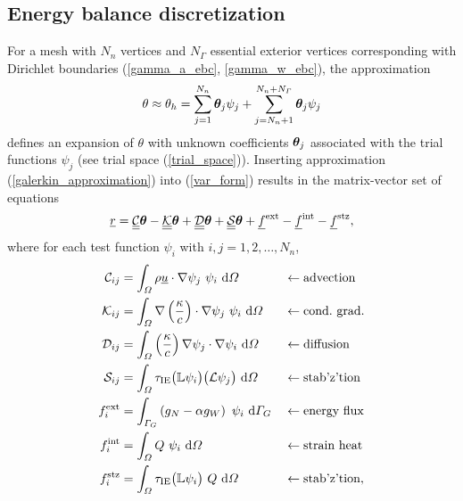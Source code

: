 
\subsection{Energy balance discretization}

For a mesh with $N_n$ vertices and $N_{\Gamma}$ essential exterior vertices corresponding with Dirichlet boundaries (\ref{gamma_a_ebc}, \ref{gamma_w_ebc}), the approximation 
\begin{align}
  \label{galerkin_approximation}
  \theta \approx \theta_h = \sum_{j=1}^{N_n} \bm{\theta}_j \psi_j + \sum_{j=N_n+1}^{N_n+N_{\varGamma}} \bm{\theta}_j \psi_j
\end{align}
defines an expansion of $\theta$ with unknown coefficients $\bm{\theta}_j$ associated with the trial functions $\psi_j$ (see trial space (\ref{trial_space})). Inserting approximation (\ref{galerkin_approximation}) into (\ref{var_form}) results in the matrix-vector set of equations
\begin{align}
  \label{component_var_form}
  \underline{r} = \underline{\underline{\mathcal{C}}}\bm{\theta} - \underline{\underline{\mathcal{K}}}\bm{\theta} + \underline{\underline{\mathcal{D}}}\bm{\theta} + \underline{\underline{\mathcal{S}}} \bm{\theta} + \underline{f}^{\text{ext}} - \underline{f}^{\text{int}} - \underline{f}^{\text{stz}},
\end{align}
where for each test function $\psi_i$ with $i,j = 1, 2, \ldots, N_n$,
\begin{align}
  \label{advective_form}
  \mathcal{C}_{ij} &= \int_{\varOmega} \rho \underline{u} \cdot \nabla \psi_j\ \psi_i \ \mathrm{d}\varOmega &&\leftarrow \text{advection} \\
  \label{conductive_gradient_form}
  \mathcal{K}_{ij} &= \int_{\varOmega} \nabla \left( \frac{\kappa}{c} \right) \cdot \nabla \psi_j\ \psi_i \ \mathrm{d}\varOmega &&\leftarrow \text{cond.~grad.} \\
  \label{diffusion_form}
  \mathcal{D}_{ij} &= \int_{\varOmega} \left( \frac{\kappa}{c} \right) \nabla \psi_j \cdot \nabla \psi_i \ \mathrm{d}\varOmega &&\leftarrow \text{diffusion} \\
  \label{stabilization_form_a}
  \mathcal{S}_{ij} &= \int_{\varOmega} \tau_{\text{IE}} \big( \mathbb{L} \psi_i \big) \big( \mathcal{L} \psi_j \big) \ \mathrm{d}\varOmega &&\leftarrow \text{stab'z'tion} \\
  \label{basal_energy_gradient_form}
  f_i^{\text{ext}} &= \int_{\varGamma_G} \left( g_N - \alpha g_W \right)\ \psi_i \ \mathrm{d}\varGamma_G &&\leftarrow \text{energy flux} \\
  \label{internal_friction_form}
  f_i^{\text{int}} &= \int_{\varOmega} Q\ \psi_i \ \mathrm{d}\varOmega &&\leftarrow \text{strain heat} \\
  \label{stabilization_form_l}
  f_i^{\text{stz}} &= \int_{\varOmega} \tau_{\text{IE}} \big( \mathbb{L} \psi_i \big)\ Q \ \mathrm{d}\varOmega &&\leftarrow \text{stab'z'tion},
\end{align}
